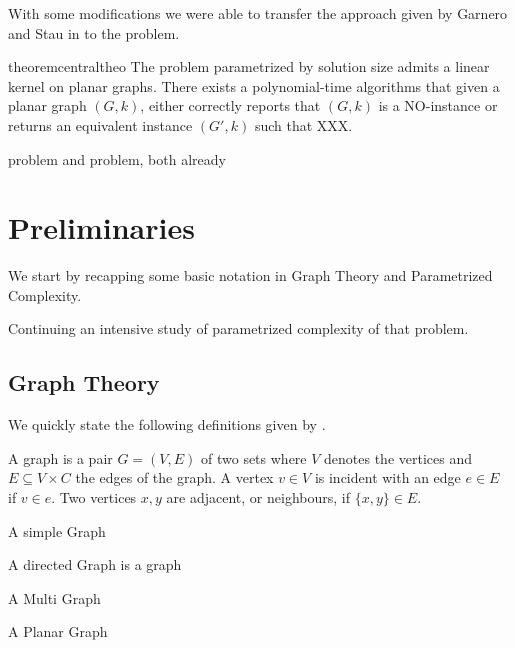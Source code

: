 With some  modifications we were able to transfer the approach given by Garnero and Stau in \cite{Garnero2018} to the \sdom problem.

\begin{restatable}[]{theorem}{centraltheo}\label{thm:central}
    The \sdom problem parametrized by solution size admits a linear kernel on planar graphs. There exists a polynomial-time algorithms that given a planar graph $(G, k)$, either correctly reports that $(G, k)$ is a NO-instance or returns an equivalent instance $(G', k)$ such that XXX.
\end{restatable}

 \dom problem and \tdom problem, both already 

\chapter{Preliminaries}
We start by recapping some basic notation in Graph Theory and Parametrized Complexity. 

Continuing an intensive study of parametrized complexity of that problem. 

\section{Graph Theory}
We quickly state the following definitions given by {\cite[p.~xxx]{diestel10}}.

\begin{definition}[Graph]
A graph is a pair $G = (V, E)$ of two sets where $V$ denotes the vertices and $E \subseteq V \times C$ the edges of the graph.  A vertex $v \in V$ is incident with an edge $e \in E$ if $v \in e$. Two vertices $x, y$ are adjacent, or neighbours, if $\{x,y \} \in E$.
\end{definition}

\begin{definition}
    A simple Graph

    A directed Graph is a graph

    A Multi Graph

    A Planar Graph
\end{definition}

\begin{definition}
\end{definition}


